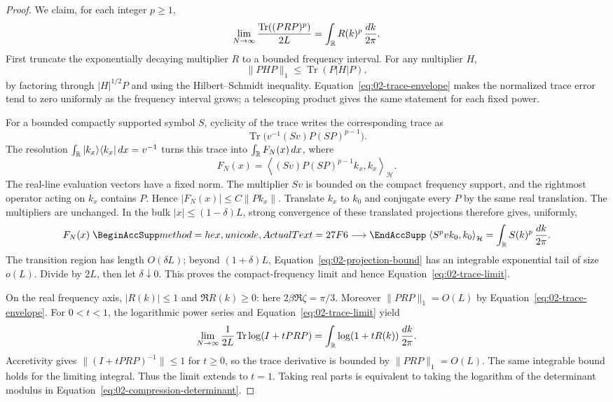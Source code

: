 \begin{proof}
We claim, for each integer $p\ge1$,
\begin{equation}\label{eq:02-trace-limit}
 \lim_{N\to\infty}\frac{\operatorname{Tr}((PRP)^p)}{2L}
       =\int_\mathbb R R(k)^p\,\frac{dk}{2\pi}.
\end{equation}
First truncate the exponentially decaying multiplier $R$ to a bounded
frequency interval. For any multiplier $H$,
\[
 \|PHP\|_1\le\operatorname{Tr}(P|H|P),
\]
by factoring through $|H|^{1/2}P$ and using the Hilbert--Schmidt
inequality. Equation~\eqref{eq:02-trace-envelope} makes the normalized
trace error tend to zero uniformly as the frequency interval grows;
a telescoping product gives the same statement for each fixed power.

For a bounded compactly supported symbol $S$, cyclicity of the trace
writes the corresponding trace as
\[
 \operatorname{Tr}\bigl(v^{-1}(Sv)P(SP)^{p-1}\bigr).
\]
The resolution
$\int_\mathbb R|k_x\rangle\langle k_x|\,dx=v^{-1}$ turns this trace into
$\int_\mathbb R F_N(x)\,dx$, where
\[
 F_N(x)=\left\langle(Sv)P(SP)^{p-1}k_x,k_x\right\rangle_{\mathcal H}.
\]
The real-line evaluation vectors have a fixed norm. The multiplier
$Sv$ is bounded on the compact frequency support, and the rightmost
operator acting on $k_x$ contains $P$. Hence
$|F_N(x)|\le C\|Pk_x\|$.
Translate $k_x$ to $k_0$ and conjugate every $P$ by the same real
translation. The multipliers are unchanged. In the bulk
$|x|\le(1-\delta)L$, strong convergence of these translated
projections therefore gives, uniformly,
\[
 F_N(x)\longrightarrow
 \left\langle S^pv k_0,k_0\right\rangle_{\mathcal H}
 =\int_\R S(k)^p\,\frac{dk}{2\pi}.
\]
The transition region has length $O(\delta L)$; beyond $(1+\delta)L$,
Equation~\eqref{eq:02-projection-bound} has an integrable exponential
tail of size $o(L)$. Divide by $2L$, then let $\delta\downarrow0$.
This proves the compact-frequency limit and hence
Equation~\eqref{eq:02-trace-limit}.

On the real frequency axis, $|R(k)|\le1$ and $\Re R(k)\ge0$:
here $2\beta\Re\zeta=\pi/3$. Moreover
$\|PRP\|_1=O(L)$ by Equation~\eqref{eq:02-trace-envelope}.
For $0<t<1$, the logarithmic power series and
Equation~\eqref{eq:02-trace-limit} yield
\[
 \lim_{N\to\infty}\frac1{2L}
       \operatorname{Tr}\log(I+tPRP)
 =\int_\mathbb R\log(1+tR(k))\,\frac{dk}{2\pi}.
\]
Accretivity gives $\|(I+tPRP)^{-1}\|\le1$ for $t\ge0$, so the
trace derivative is bounded by $\|PRP\|_1=O(L)$. The same integrable
bound holds for the limiting integral. Thus the limit extends to
$t=1$. Taking real parts is equivalent to taking the logarithm of
the determinant modulus in Equation~\eqref{eq:02-compression-determinant}.


\end{proof}
